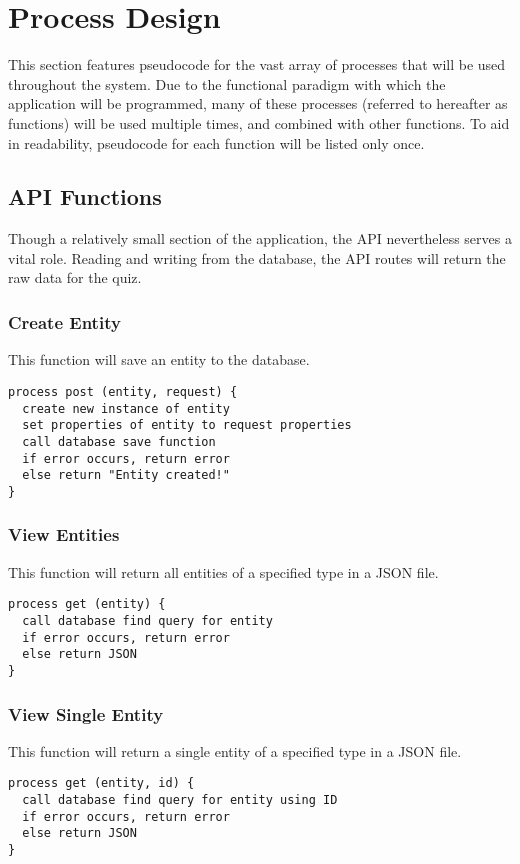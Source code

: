 \section{Process Design}
This section features pseudocode for the vast array of processes that will be used throughout the system. Due to the functional paradigm with which the application will be programmed, many of these processes (referred to hereafter as functions) will be used multiple times, and combined with other functions. To aid in readability, pseudocode for each function will be listed only once.

\subsection{API Functions}
Though a relatively small section of the application, the API nevertheless serves a vital role. Reading and writing from the database, the API routes will return the raw data for the quiz.

\subsubsection{Create Entity}
This function will save an entity to the database.
\begin{verbatim}
process post (entity, request) {
  create new instance of entity
  set properties of entity to request properties
  call database save function
  if error occurs, return error
  else return "Entity created!"
}
\end{verbatim}

\subsubsection{View Entities}
This function will return all entities of a specified type in a JSON file.
\begin{verbatim}
process get (entity) {
  call database find query for entity
  if error occurs, return error
  else return JSON
}
\end{verbatim}

\subsubsection{View Single Entity}
This function will return a single entity of a specified type in a JSON file.
\begin{verbatim}
process get (entity, id) {
  call database find query for entity using ID
  if error occurs, return error
  else return JSON
}
\end{verbatim}

